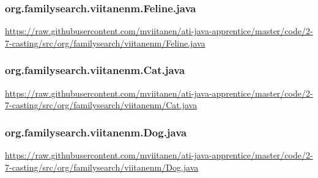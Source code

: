 \vspace{1em}
\subsubsection*{org.familysearch.viitanenm.Feline.java}
\noindent
\begin{minipage}{.6in}
\end{minipage}
\begin{minipage}{6in}
  \url{https://raw.githubusercontent.com/mviitanen/ati-java-apprentice/master/code/2-7-casting/src/org/familysearch/viitanenm/Feline.java}
\end{minipage}

\vspace{1em}
\subsubsection*{org.familysearch.viitanenm.Cat.java}
\noindent
\begin{minipage}{.6in}
\end{minipage}
\begin{minipage}{6in}
  \url{https://raw.githubusercontent.com/mviitanen/ati-java-apprentice/master/code/2-7-casting/src/org/familysearch/viitanenm/Cat.java}
\end{minipage}

\vspace{1em}
\subsubsection*{org.familysearch.viitanenm.Dog.java}
\noindent
\begin{minipage}{.6in}
\end{minipage}
\begin{minipage}{6in}
  \url{https://raw.githubusercontent.com/mviitanen/ati-java-apprentice/master/code/2-7-casting/src/org/familysearch/viitanenm/Dog.java}
\end{minipage}